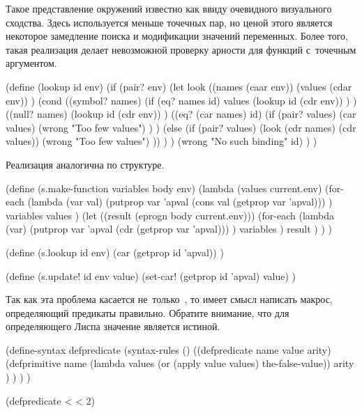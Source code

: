 
Такое представление окружений известно как  ввиду очевидного
визуального сходства. Здесь используется меньше точечных пар, но ценой этого
является некоторое замедление поиска и модификации значений переменных. Более
того, такая реализация  делает невозможной проверку арности для
функций с~точечным аргументом.

\begin{code:lisp}
(define (lookup id env)
  (if (pair? env)
      (let look ((names  (caar env))
                 (values (cdar env)) )
        (cond ((symbol? names)
               (if (eq? names id)
                   values
                   (lookup id (cdr env)) ) )
              ((null? names)
               (lookup id (cdr env)) )
              ((eq? (car names) id)
               (if (pair? values) (car values)
                   (wrong "Too few values") ) )
              (else (if (pair? values)
                        (look (cdr names) (cdr values))
                        (wrong "Too few values") )) ) )
      (wrong "No such binding" id) ) )
\end{code:lisp}

\noindent
Реализация  аналогична по структуре.



\begin{code:lisp}
(define (s.make-function variables body env)
  (lambda (values current.env)
    (for-each (lambda (var val)
                (putprop var 'apval (cons val (getprop var 'apval))) )
              variables values )
    (let ((result (eprogn body current.env)))
      (for-each (lambda (var)
                  (putprop var 'apval (cdr (getprop var 'apval))) )
                variables )
      result ) ) )

(define (s.lookup id env)
  (car (getprop id 'apval)) )

(define (s.update! id env value)
  (set-car! (getprop id 'apval) value) )
\end{code:lisp}



Так как эта проблема касается не~только~\ic{<}, то имеет смысл написать макрос,
определяющий предикаты правильно. Обратите внимание, что для определяющего
Лиспа значение  является истиной.

\begin{code:lisp}
(define-syntax defpredicate
  (syntax-rules ()
    ((defpredicate name value arity)
     (defprimitive name
      (lambda values (or (apply value values) the-false-value))
      arity ) ) ) )

(defpredicate < < 2)
\end{code:lisp}


